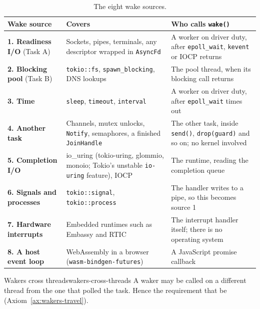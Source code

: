\begin{table}[htbp]
    \centering\small
    \begin{tabularx}{\linewidth}{>{\raggedright\arraybackslash}p{3.3cm} Y Y}
        \toprule
        \textbf{Wake source} & \textbf{Covers} & \textbf{Who calls \texttt{wake()}} \\
        \midrule
        \textbf{1. Readiness I/O} (Task A) & Sockets, pipes, terminals, any descriptor wrapped in \texttt{AsyncFd} & A worker on driver duty, after \texttt{epoll\_wait}, \texttt{kevent} or IOCP returns \\
        \textbf{2. Blocking pool} (Task B) & \texttt{tokio::fs}, \texttt{spawn\_blocking}, DNS lookups & The pool thread, when its blocking call returns \\
        \textbf{3. Time} & \texttt{sleep}, \texttt{timeout}, \texttt{interval} & A worker on driver duty, after \texttt{epoll\_wait} times out \\
        \textbf{4. Another task} & Channels, mutex unlocks, \texttt{Notify}, semaphores, a finished \texttt{JoinHandle} & The other task, inside \texttt{send()}, \texttt{drop(guard)} and so on; no kernel involved \\
        \textbf{5. Completion I/O} & io\_uring (tokio-uring, glommio, monoio; Tokio's unstable \texttt{io-uring} feature), IOCP & The runtime, reading the completion queue \\
        \textbf{6. Signals and processes} & \texttt{tokio::signal}, \texttt{tokio::process} & The handler writes to a pipe, so this becomes source 1 \\
        \textbf{7. Hardware interrupts} & Embedded runtimes such as Embassy and RTIC & The interrupt handler itself; there is no operating system \\
        \textbf{8. A host event loop} & WebAssembly in a browser (\texttt{wasm-bindgen-futures}) & A JavaScript promise callback \\
        \bottomrule
    \end{tabularx}
    \caption{The eight wake sources.}
    \label{tab:wakers-6.1}
\end{table}

\begin{corollary}{Wakers cross threads}{wakers-cross-threads}
    A waker may be called on a different thread from the one that polled the task. Hence the requirement that  be  (Axiom~\ref{ax:wakers-travel}).
\end{corollary}

